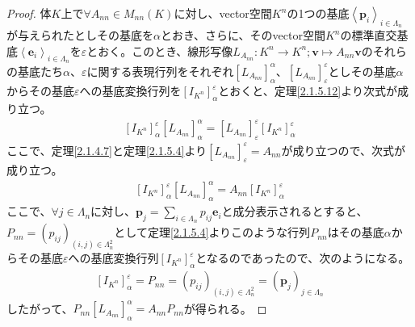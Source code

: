 \documentclass[dvipdfmx]{jsarticle}
\begin{document}
\begin{proof}
体$K$上で$\forall A_{nn} \in M_{nn}(K)$に対し、vector空間$K^{n}$の1つの基底$\left\langle \mathbf{p}_{i} \right\rangle_{i \in \varLambda_{n}}$が与えられたとしその基底を$\alpha$とおき、さらに、そのvector空間$K^{n}$の標準直交基底$\left\langle \mathbf{e}_{i} \right\rangle_{i \in \varLambda_{n}}$を$\varepsilon$とおく。このとき、線形写像$L_{A_{nn}}:K^{n} \rightarrow K^{n};\mathbf{v} \mapsto A_{nn}\mathbf{v}$のそれらの基底たち$\alpha$、$\varepsilon$に関する表現行列をそれぞれ$\left[ L_{A_{nn}} \right]_{\alpha}^{\alpha}$、$\left[ L_{A_{nn}} \right]_{\varepsilon}^{\varepsilon}$としその基底$\alpha$からその基底$\varepsilon$への基底変換行列を$\left[ I_{K^{n}} \right]^{\varepsilon}_{\alpha}$とおくと、定理\ref{2.1.5.12}より次式が成り立つ。
\begin{align*}
\left[ I_{K^{n}} \right]^{\varepsilon}_{\alpha}\left[ L_{A_{nn}} \right]_{\alpha}^{\alpha} = \left[ L_{A_{nn}} \right]_{\varepsilon}^{\varepsilon}\left[ I_{K^{n}} \right]^{\varepsilon}_{\alpha}
\end{align*}
ここで、定理\ref{2.1.4.7}と定理\ref{2.1.5.4}より$\left[ L_{A_{nn}} \right]_{\varepsilon}^{\varepsilon} = A_{nn}$が成り立つので、次式が成り立つ。
\begin{align*}
\left[ I_{K^{n}} \right]^{\varepsilon}_{\alpha}\left[ L_{A_{nn}} \right]_{\alpha}^{\alpha} = A_{nn}\left[ I_{K^{n}} \right]^{\varepsilon}_{\alpha}
\end{align*}
ここで、$\forall j \in \varLambda_{n}$に対し、$\mathbf{p}_{j} = \sum_{i \in \varLambda_{n}} {p_{ij}\mathbf{e}_{i}}$と成分表示されるとすると、$P_{nn} = \left( p_{ij} \right)_{(i,j) \in \varLambda_{n}^{2}}$として定理\ref{2.1.5.4}よりこのような行列$P_{nn}$はその基底$\alpha$からその基底$\varepsilon$への基底変換行列$\left[ I_{K^{n}} \right]^{\varepsilon}_{\alpha}$となるのであったので、次のようになる。
\begin{align*}
\left[ I_{K^{n}} \right]^{\varepsilon}_{\alpha} = P_{nn} = \left( p_{ij} \right)_{(i,j) \in \varLambda_{n}^{2}} = \left( \mathbf{p}_{j} \right)_{j \in \varLambda_{n}}
\end{align*}
したがって、$P_{nn}\left[ L_{A_{nn}} \right]_{\alpha}^{\alpha} = A_{nn}P_{nn}$が得られる。
\end{proof}
\end{document}
